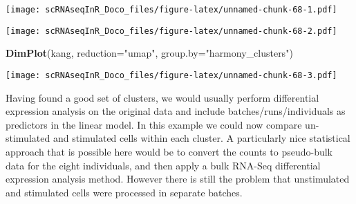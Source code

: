 \documentclass[
]{book}
\newenvironment{Shaded}{\begin{snugshade}}{\end{snugshade}}
\newcommand{\AttributeTok}[1]{\textcolor[rgb]{0.13,0.29,0.53}{#1}}
\newcommand{\CommentTok}[1]{\textcolor[rgb]{0.56,0.35,0.01}{\textit{#1}}}
\newcommand{\DecValTok}[1]{\textcolor[rgb]{0.00,0.00,0.81}{#1}}
\newcommand{\FloatTok}[1]{\textcolor[rgb]{0.00,0.00,0.81}{#1}}
\newcommand{\FunctionTok}[1]{\textcolor[rgb]{0.13,0.29,0.53}{\textbf{#1}}}
\newcommand{\NormalTok}[1]{#1}
\newcommand{\OtherTok}[1]{\textcolor[rgb]{0.56,0.35,0.01}{#1}}
\newcommand{\SpecialCharTok}[1]{\textcolor[rgb]{0.81,0.36,0.00}{\textbf{#1}}}
\newcommand{\StringTok}[1]{\textcolor[rgb]{0.31,0.60,0.02}{#1}}
\begin{document}
\texttt{[image: scRNAseqInR\_Doco\_files/figure-latex/unnamed-chunk-68-1.pdf]}

\begin{Shaded}
\end{Shaded}

\texttt{[image: scRNAseqInR\_Doco\_files/figure-latex/unnamed-chunk-68-2.pdf]}

\begin{Shaded}
\begin{Highlighting}[]
\FunctionTok{DimPlot}\NormalTok{(kang, }\AttributeTok{reduction=}\StringTok{"umap"}\NormalTok{, }\AttributeTok{group.by=}\StringTok{"harmony\_clusters"}\NormalTok{)}
\end{Highlighting}
\end{Shaded}

\texttt{[image: scRNAseqInR\_Doco\_files/figure-latex/unnamed-chunk-68-3.pdf]}

Having found a good set of clusters, we would usually perform differential expression analysis on the original data and include batches/runs/individuals as predictors in the linear model. In this example we could now compare un-stimulated and stimulated cells within each cluster. A particularly nice statistical approach that is possible here would be to convert the counts to pseudo-bulk data for the eight individuals, and then apply a bulk RNA-Seq differential expression analysis method. However there is still the problem that unstimulated and stimulated cells were processed in separate batches.
\end{document}
